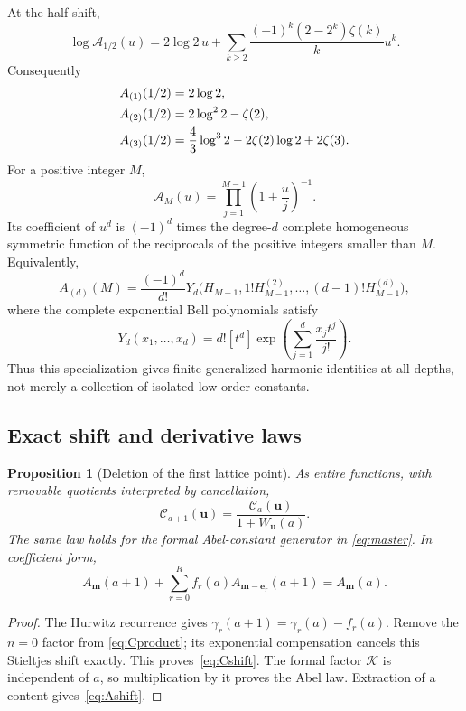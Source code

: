 \documentclass[11pt,oneside]{article}
\numberwithin{equation}{section}
\newtheorem{proposition}[theorem]{Proposition}
\theoremstyle{definition}
\theoremstyle{remark}
\newcommand{\uu}{\mathbf u}
\newcommand{\mm}{\mathbf m}
\newcommand{\ee}{\mathbf e}
\newcommand{\CC}{\mathcal C}
\newcommand{\KK}{\mathcal K}
\newcommand{\Acal}{\mathcal A}
\begin{document}
At the half shift,
\begin{equation}\label{eq:half-log}
\log\Acal_{1/2}(u)=2\log2\,u+
 \sum_{k\ge2}\frac{(-1)^k(2-2^k)\zeta(k)}k u^k.
\end{equation}
Consequently
\begin{align}
A_{(1)}(1/2)&=2\log2,\notag\\
A_{(2)}(1/2)&=2\log^22-\zeta(2),\notag\\
A_{(3)}(1/2)&=\frac43\log^32-2\zeta(2)\log2+2\zeta(3).
\label{eq:half-examples}
\end{align}
For a positive integer $M$,
\begin{equation}\label{eq:integer-A}
\Acal_M(u)=\prod_{j=1}^{M-1}\left(1+\frac uj\right)^{-1}.
\end{equation}
Its coefficient of $u^d$ is $(-1)^d$ times the degree-$d$ complete homogeneous
symmetric function of the reciprocals of the positive integers smaller than
$M$. Equivalently,
\begin{equation}\label{eq:integer-bell}
A_{(d)}(M)=\frac{(-1)^d}{d!}
 Y_d\bigl(H_{M-1},1!H_{M-1}^{(2)},\ldots,(d-1)!H_{M-1}^{(d)}\bigr),
\end{equation}
where the complete exponential Bell polynomials satisfy
\[
Y_d(x_1,\ldots,x_d)=d![t^d]\exp\left(\sum_{j=1}^d\frac{x_jt^j}{j!}\right).
\]
Thus this specialization gives finite generalized-harmonic identities at
all depths, not merely a collection of isolated low-order constants.

\subsection{Exact shift and derivative laws}

\begin{proposition}[Deletion of the first lattice point]\label{prop:shift}
As entire functions, with removable quotients interpreted by cancellation,
\begin{equation}\label{eq:Cshift}
\CC_{a+1}(\uu)=\frac{\CC_a(\uu)}{1+W_{\uu}(a)}.
\end{equation}
The same law holds for the formal Abel-constant generator in
\eqref{eq:master}. In coefficient form,
\begin{equation}\label{eq:Ashift}
A_{\mm}(a+1)+\sum_{r=0}^R f_r(a)A_{\mm-\ee_r}(a+1)=A_{\mm}(a).
\end{equation}
\end{proposition}

\begin{proof}
The Hurwitz recurrence gives
$\gamma_r(a+1)=\gamma_r(a)-f_r(a)$. Remove the $n=0$ factor from
\eqref{eq:Cproduct}; its exponential compensation cancels this Stieltjes
shift exactly. This proves~\eqref{eq:Cshift}. The formal factor $\KK$ is
independent of $a$, so multiplication by it proves the Abel law. Extraction
of a content gives~\eqref{eq:Ashift}.
\end{proof}
\end{document}
